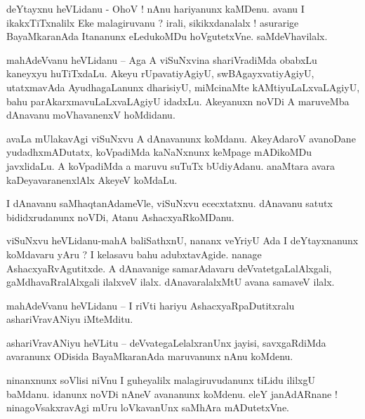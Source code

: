 \documentclass{article}
\begin{document}
\begin{mn}%
deYtayxnu heVLidanu - OhoV ! nAnu hariyanunx kaMDenu. avanu I ikakxTiTxnalilx Eke malagiruvanu ? 
irali, sikikxdanalalx ! asurarige BayaMkaranAda Itananunx eLedukoMDu hoVgutetxVne. saMdeVhavilalx.
\end{mn}

\begin{mn}%
mahAdeVvanu heVLidanu -- Aga A viSuNxvina shariVradiMda obabxLu kaneyxyu huTiTxdaLu. Akeyu 
rUpavatiyAgiyU, swBAgayxvatiyAgiyU, utatxmavAda AyudhagaLanunx dharisiyU, miMcinaMte 
kAMtiyuLaLxvaLAgiyU, bahu parAkarxmavuLaLxvaLAgiyU idadxLu. Akeyanuxn noVDi A maruveMba dAnavanu 
moVhavanenxV hoMdidanu.
\end{mn}

\begin{mn}%
avaLa mUlakavAgi viSuNxvu A dAnavanunx koMdanu. AkeyAdaroV avanoDane yudadhxmADutatx, koVpadiMda 
kaNaNxnunx keMpage mADikoMDu javxlidaLu. A koVpadiMda a maruvu suTuTx bUdiyAdanu. anaMtara avara 
kaDeyavaranenxlAlx AkeyeV koMdaLu.
\end{mn}

\begin{mn}%
I dAnavanu saMhaqtanAdameVle, viSuNxvu ececxtatxnu. dAnavanu satutx bididxrudanunx noVDi, Atanu 
AshacxyaRkoMDanu.
\end{mn}

\begin{mn}%
viSuNxvu heVLidanu-mahA baliSathxnU, nananx veYriyU Ada I deYtayxnanunx koMdavaru yAru ? I kelasavu 
bahu adubxtavAgide. nanage AshacxyaRvAgutitxde. A dAnavanige samarAdavaru deVvatetgaLalAlxgali, 
gaMdhavaRralAlxgali ilalxveV ilalx. dAnavaralalxMtU avana samaveV ilalx.
\end{mn}

\begin{mn}%
mahAdeVvanu heVLidanu -- I riVti hariyu AshacxyaRpaDutitxralu ashariVravANiyu iMteMditu.
\end{mn}

\begin{mn}%
ashariVravANiyu heVLitu -- deVvategaLelalxranUnx jayisi, savxgaRdiMda avaranunx ODisida 
BayaMkaranAda maruvanunx nAnu koMdenu.
\end{mn}

\begin{mn}%
ninanxnunx soVlisi niVnu I guheyalilx malagiruvudanunx tiLidu ililxgU baMdanu. idanunx noVDi nAneV 
avananunx koMdenu. eleY janAdARnane ! ninagoVsakxravAgi mUru loVkavanUnx saMhAra mADutetxVne.
\end{mn}
\end{document}
